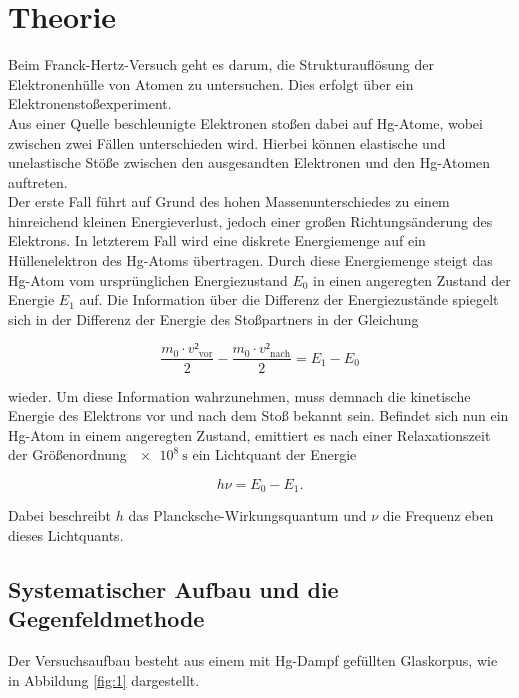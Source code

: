\section{Theorie}
\label{sec:Theorie}

Beim Franck-Hertz-Versuch geht es darum, die Strukturauflösung der Elektronenhülle von Atomen zu untersuchen.
Dies erfolgt über ein Elektronenstoßexperiment.\\
Aus einer Quelle beschleunigte Elektronen stoßen dabei auf Hg-Atome, wobei zwischen zwei Fällen unterschieden wird.
Hierbei können elastische und unelastische Stöße zwischen den ausgesandten Elektronen und den Hg-Atomen auftreten.\\
Der erste Fall führt auf Grund des hohen Massenunterschiedes zu einem hinreichend kleinen Energieverlust, jedoch einer großen Richtungsänderung des Elektrons.
In letzterem Fall wird eine diskrete Energiemenge auf ein Hüllenelektron des Hg-Atoms übertragen.
Durch diese Energiemenge steigt das Hg-Atom vom ursprünglichen Energiezustand $E_0$ in einen angeregten Zustand der Energie $E_1$ auf.
Die Information über die Differenz der Energiezustände spiegelt sich in der Differenz der Energie des Stoßpartners in der Gleichung

\begin{equation}
\frac{m_0 \cdot v²_{\text{vor}}}{2} - \frac{m_0 \cdot v²_{\text{nach}}}{2} = E_1 - E_0 \label{eqn:1}
\end{equation}

wieder.
Um diese Information wahrzunehmen, muss demnach die kinetische Energie des Elektrons vor und nach dem Stoß bekannt sein.
Befindet sich nun ein Hg-Atom in einem angeregten Zustand, emittiert es nach einer Relaxationszeit der Größenordnung $\SI{e8}{\second}$ ein Lichtquant der Energie

\begin{equation}
  h\nu = E_0 - E_1. \label{eqn:2}
\end{equation}

Dabei beschreibt $h$ das Plancksche-Wirkungsquantum und $\nu$ die Frequenz eben dieses Lichtquants.

\subsection{Systematischer Aufbau und die Gegenfeldmethode}
Der Versuchsaufbau besteht aus einem mit Hg-Dampf gefüllten Glaskorpus, wie in Abbildung \ref{fig:1} dargestellt.

